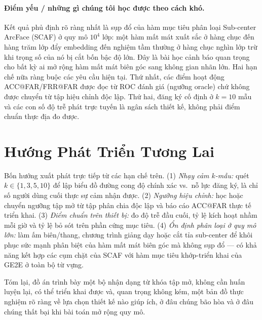 \documentclass[12pt,a4paper]{report}
\begin{document}
\paragraph{Điểm yếu / những gì chúng tôi học được theo cách khó.} Kết quả phủ
định rõ ràng nhất là sụp đổ của hàm mục tiêu phân loại Sub-center ArcFace (SCAF)
ở quy mô $10^4$ lớp: một hàm mất mát xuất sắc ở hàng chục đến hàng trăm lớp đẩy
embedding đến nghiệm tầm thường ở hàng chục nghìn lớp trừ khi trọng số của nó bị
cắt bốn bậc độ lớn. Đây là bài học cảnh báo quan trọng cho bất kỳ ai mở rộng hàm
mất mát biên góc sang không gian nhãn lớn. Hai hạn chế nữa ràng buộc các yêu cầu
hiện tại. Thứ nhất, các điểm hoạt động ACC@FAR/FRR@FAR được đọc từ ROC đánh giá
(ngưỡng oracle) chứ không được chuyển từ tập hiệu chỉnh độc lập. Thứ hai, đăng ký
cố định ở $k{=}10$ mẫu và các con số độ trễ phát trực tuyến là ngân sách thiết kế,
không phải điểm chuẩn thực địa đo được.

\section{Hướng Phát Triển Tương Lai}\label{sec:future}

Bốn hướng xuất phát trực tiếp từ các hạn chế trên.
(1) \emph{Nhạy cảm $k$-mẫu:} quét $k\in\{1,3,5,10\}$ để lập biểu đồ đường cong
độ chính xác vs.\ nỗ lực đăng ký, là chỉ số người dùng cuối thực sự cảm nhận được.
(2) \emph{Ngưỡng hiệu chỉnh:} học hoặc chuyển ngưỡng tập mở từ tập phân chia
độc lập và báo cáo ACC@FAR thực tế triển khai.
(3) \emph{Điểm chuẩn trên thiết bị:} đo độ trễ đầu cuối, tỷ lệ kích hoạt nhầm mỗi
giờ và tỷ lệ bỏ sót trên phần cứng mục tiêu.
(4) \emph{Ổn định phân loại ở quy mô lớn:} làm ấm biên/thang, chương trình giảng
dạy hoặc cắt tỉa sub-center để khôi phục sức mạnh phân biệt của hàm mất mát biên
góc mà không sụp đổ --- có khả năng kết hợp các cụm chặt của SCAF với hàm mục tiêu
khớp-triển khai của GE2E ở toàn bộ từ vựng.

Tóm lại, đồ án trình bày một bộ nhận dạng từ khóa tập mở, không cần huấn luyện
lại, có thể triển khai được và, quan trọng không kém, một bản đồ thực nghiệm rõ
ràng về lựa chọn thiết kế nào giúp ích, ở đâu chúng bão hòa và ở đâu chúng thất
bại khi bài toán mở rộng quy mô.
\end{document}
